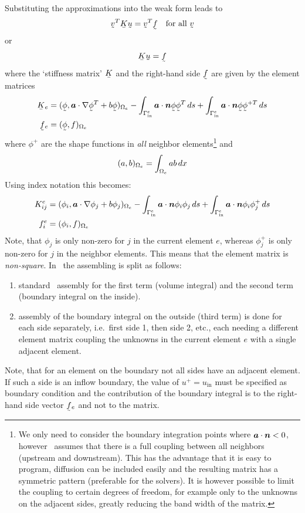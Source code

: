 Substituting the approximations into the weak form leads to
\[
 \col v^T\mat K\col u=
        \col v^T\col f \quad\text{for all }\col v
\]
or
\[
 \mat K\col u= \col f
\]
where the `stiffness matrix' $\mat K$ and
the right-hand side $\col f$ are given by the element matrices
\begin{align*}
 \mat K_e&=(\col\phi,\vek a\cdot\nabla{\col\phi^T}+b\col\phi)_{\Omega_e}
    -\int_{\Gamma^e_{\text{in}}}\vek a\cdot\vek n\col\phi\col\phi^T\D s
    +\int_{\Gamma^e_{\text{in}}}\vek a\cdot\vek n\col\phi\col\phi^{+T}\D s\\
\col f_e&= (\col\phi,f)_{\Omega_e}
\end{align*}
where $\phi^{+}$ are the shape functions in \emph{all} neighbor
elements\footnote{We only need to consider the boundary integration points
where $\boldsymbol{a}\cdot\boldsymbol{n}<0$, however \tfem\ assumes that there is a full
coupling between all neighbors (upstream and downstream). This has the
advantage that it is easy to program, diffusion can be included easily and the
resulting matrix has a symmetric pattern (preferable for the solvers). It
is however possible to limit the coupling to certain degrees of freedom, for
example only to the unknowns on the adjacent sides, greatly reducing the band
width of the matrix.} and
\[
   (a,b)_{\Omega_e}=\int_{\Omega_e}ab\,d x
\]
Using index notation this becomes:
\begin{align*}
 K^e_{ij}&=(\phi_i,\boldsymbol{a}\cdot\nabla{\phi_j}+b\phi_j)_{\Omega_e}
    -\int_{\Gamma^e_{\text{in}}}\boldsymbol{a}\cdot\boldsymbol{n}\phi_i\phi_j\,d s
    +\int_{\Gamma^e_{\text{in}}}\boldsymbol{a}\cdot\boldsymbol{n}\phi_i\phi^+_j\,d s\\
f^e_i&= (\phi_i,f)_{\Omega_e}
\end{align*}
Note, that $\phi_j$ is only non-zero for $j$ in the current element $e$,
whereas $\phi^+_j$ is only non-zero for $j$ in the neighbor elements.
This means that the element matrix is \emph{non-square}. In \tfem\ the
assembling is split as follows:
\begin{enumerate}
   \item standard \fem\ assembly for the first term (volume integral) and the
         second term (boundary integral on the inside).
   \item assembly of the boundary integral on the outside (third term)
         is done for each side separately, i.e.\
         first side 1, then side 2, etc., each needing a different element
         matrix coupling the unknowns in the current element $e$ with a single
         adjacent element. 
\end{enumerate}
Note, that for an element on the boundary not all sides have an adjacent
element. If such a side is an inflow boundary, the value of $u^+=u_\text{in}$
must be specified as boundary condition and the contribution of the boundary
integral is to the right-hand side vector $\col f_e$ and not to the matrix.

